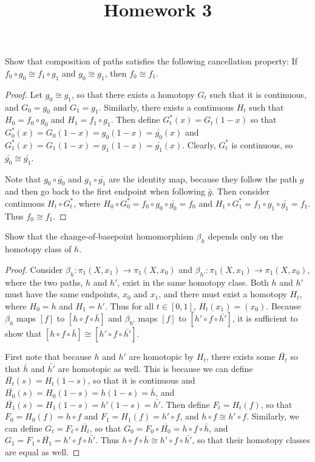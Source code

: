 \documentclass[12pt]{article}
\newenvironment{statement}[2][Statement]{\begin{trivlist}
\item[\hskip \labelsep {\bfseries #1}\hskip \labelsep {\bfseries #2.}]}{\end{trivlist}}
\begin{document}
 
\title{Homework 3} 
\author{}
\maketitle

\begin{statement}[Problem]{1}
  Show that composition of paths satisfies the following cancellation property: 
  If $f_0 \circ g_0 \cong f_1 \circ g_1$ and $g_0 \cong g_1$, then $f_0 \cong f_1$.
\end{statement}
\begin{proof}
  Let $g_0 \cong g_1$, so that there exists a homotopy $G_t$ 
  such that it is continuous, and $G_0 = g_0$ and $G_1 = g_1$. Similarly, there exists a continuous 
  $H_t$ such that $H_0 = f_0 \circ g_0$ and $H_1 = f_1 \circ g_1$. Then define $G^*_t(x)=G_t(1-x)$ so that $G^*_0(x)=G_0(1-x)=g_0(1-x)=\bar{g_0}(x)$ and $G^*_1(x)=G_1(1-x)=g_1(1-x)=\bar{g_1}(x)$. 
  Clearly, $G^*_t$ is continuous, so $\bar{g_0} \cong \bar{g_1}$.
  \par Note that $g_0 \circ \bar{g_0}$ and $g_1 \circ \bar{g_1}$ are the identity map, because they follow
  the path $g$ and then go back to the first endpoint when following $\bar{g}$. Then consider continuous $H_t \circ G^*_t$, where $H_0 \circ G^*_0 = f_0 \circ g_0 \circ \bar{g_0} = f_0$ and 
  $H_1 \circ G^*_1 = f_1 \circ g_1 \circ \bar{g_1} = f_1$. Thus $f_0 \cong f_1$. 
\end{proof}

\begin{statement}[Problem]{2}
  Show that the change-of-basepoint homomorphism $\beta_h$ depends only on the homotopy class of $h$.
\end{statement}
\begin{proof}
  Consider $\beta_h: \pi_1(X,x_1) \to \pi_1(X,x_0)$ and $\beta_{h'}: \pi_1(X,x_1) \to \pi_1(X,x_0)$, where the two paths, $h$ and $h'$, exist in the same homotopy class. 
  Both $h$ and $h'$ must have the same endpoints, $x_0$ and $x_1$, and there must exist a homotopy $H_t$, where $H_0 = h$ and $H_1 = h'$. 
  Thus for all $t \in [0,1]$, $H_t(x_1)=(x_0)$. Because $\beta_h$ maps $[f]$ to $[h \circ f \circ \bar{h}]$ and $\beta_{h'}$ maps 
  $[f]$ to $[h' \circ f \circ \bar{h'}]$, it is sufficient to show that $[h \circ f \circ \bar{h}] \cong [h' \circ f \circ \bar{h'}]$.
  \par First note that because $h$ and $h'$ are homotopic by $H_t$, there exists some $\bar{H_t}$ so that $\bar{h}$ and $\bar{h'}$ are homotopic as well.
  This is because we can define $\bar{H_t}(s)=H_t(1-s)$, so that it is continuous and $\bar{H_0}(s)=H_0(1-s)=h(1-s)=\bar{h}$, and $\bar{H_1}(s)=H_1(1-s)=h'(1-s)=\bar{h'}$.
  Then define $F_t=H_t(f)$, so that $F_0=H_0(f)=h \circ f$ and $F_1=H_1(f)=h' \circ f$, and $h \circ f \cong h' \circ f$. Similarly, we can define 
  $G_t = F_t \circ \bar{H_t}$, so that $G_0 = F_0 \circ \bar{H_0} = h \circ f \circ \bar{h}$, and $G_1 = F_1 \circ \bar{H_1} = h' \circ f \circ \bar{h'}$.
  Thus $h \circ f \circ \bar{h} \cong h' \circ f \circ \bar{h'}$, so that their homotopy classes are equal as well. 
\end{proof}
\end{document}
